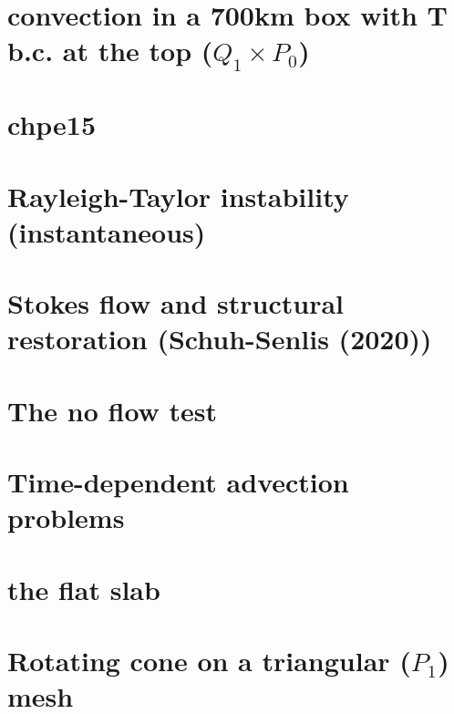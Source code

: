 \documentclass[a4paper,11pt]{report}
\begin{document}
\chapter{convection in a 700km box with T b.c. at the top  ($Q_1\times P_0$) \label{f38}} 

\chapter{chpe15 \label{f39}}

\chapter{Rayleigh-Taylor instability (instantaneous) \label{f40}} 

\chapter{Stokes flow and structural restoration (Schuh-Senlis \etal (2020))\label{f41}} 

\chapter{The no flow test \label{f42}} 

\chapter{Time-dependent advection problems\label{f43}} 

\chapter{the flat slab \label{f44}} 

\chapter{Rotating cone on a triangular ($P_1$) mesh\label{f45}} 
\end{document}

